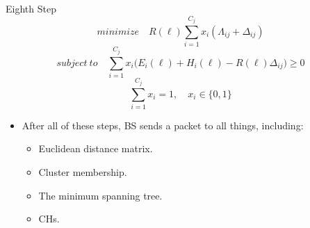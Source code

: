 \documentclass{beamer}
\begin{document}
\begin{frame}[t]{Eighth Step} %
\begin{equation}
minimize\quad R(\ell)\sum_{i=1}^{C_{j}}x_i(\Lambda_{ij}+\Delta_{ij})
\end{equation}
\begin{equation}
subject\ to\quad \sum_{i=1}^{C_j}x_i\Big(E_i(\ell)+H_i(\ell)-R(\ell)\Delta_{ij}\Big)\geq0
\end{equation}
\begin{equation}
\sum_{i=1}^{C_j}x_i=1, \quad x_i\in \{0,1\}
\end{equation}

\begin{itemize}
\justifying
\item After all of these steps, BS sends a packet to all things, including:
\begin{itemize}
\item Euclidean distance matrix.
\item Cluster membership.
\item The minimum spanning tree.
\item CHs.
\end{itemize}

\end{itemize}


\end{frame}
\end{document}
